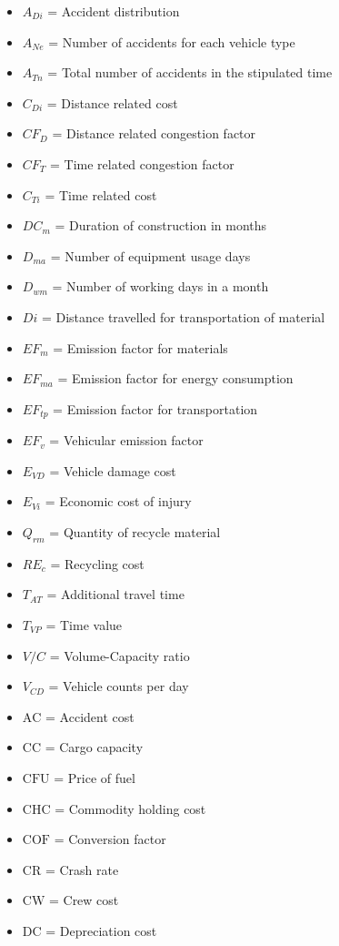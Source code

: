 \documentclass[12pt,a4paper]{article}
\begin{document}
\begin{itemize}
\item $A_{Di}$ = Accident distribution
\item $A_{Ne}$ = Number of accidents for each vehicle type
\item $A_{Tn}$ = Total number of accidents in the stipulated time
\item $C_{Di}$ = Distance related cost
\item $CF_D$ = Distance related congestion factor
\item $CF_T$ = Time related congestion factor
\item $C_{Ti}$ = Time related cost
\item $DC_m$ = Duration of construction in months
\item $D_{ma}$ = Number of equipment usage days
\item $D_{wm}$ = Number of working days in a month
\item $Di$ = Distance travelled for transportation of material
\item $EF_m$ = Emission factor for materials
\item $EF_{ma}$ = Emission factor for energy consumption
\item $EF_{tp}$ = Emission factor for transportation
\item $EF_v$ = Vehicular emission factor
\item $E_{VD}$ = Vehicle damage cost
\item $E_{Vi}$ = Economic cost of injury
\item $Q_{rm}$ = Quantity of recycle material
\item $RE_c$ = Recycling cost
\item $T_{AT}$ = Additional travel time
\item $T_{VP}$ = Time value
\item $V/C$ = Volume-Capacity ratio
\item $V_{CD}$ = Vehicle counts per day
\item $\mathrm{AC}$ = Accident cost
\item $\mathrm{CC}$ = Cargo capacity
\item $\mathrm{CFU}$ = Price of fuel
\item $\mathrm{CHC}$ = Commodity holding cost
\item $\mathrm{COF}$ = Conversion factor
\item $\mathrm{CR}$ = Crash rate
\item $\mathrm{CW}$ = Crew cost
\item $\mathrm{DC}$ = Depreciation cost

\end{itemize}
\end{document}
